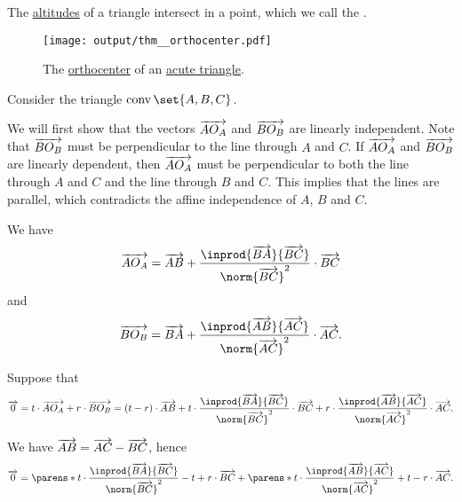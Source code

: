 \begin{proposition}\label{thm:orthocenter}\mimprovised
  The \hyperref[def:triangle_altitude]{altitudes} of a triangle intersect in a point, which we call the .

  \begin{figure}[!ht]
    \centering
    \texttt{[image: output/thm\_\_orthocenter.pdf]}
    \caption{The \hyperref[thm:orthocenter]{orthocenter} of an \hyperref[def:triangle/acute]{acute triangle}.}\label{fig:thm:orthocenter}
  \end{figure}
\end{proposition}
\begin{defproof}
  Consider the triangle \( \conv\set{ A, B, C } \).

  We will first show that the vectors \( \overrightarrow{A O_A} \) and \( \overrightarrow{B O_B} \) are linearly independent. Note that \( \overrightarrow{B O_B} \) must be perpendicular to the line through \( A \) and \( C \). If \( \overrightarrow{A O_A} \) and \( \overrightarrow{B O_B} \) are linearly dependent, then  \( \overrightarrow{A O_A} \) must be perpendicular to both the line through \( A \) and \( C \) and the line through \( B \) and \( C \). This implies that the lines are parallel, which contradicts the affine independence of \( A \), \( B \) and \( C \).

  We have
  \begin{equation*}
    \vect{A O_A}
    =
    \vect{AB} + \frac {\inprod {\vect{BA}} {\vect{BC}}} {\norm{\vect{BC}}^2} \cdot \vect{BC}
  \end{equation*}
  and
  \begin{equation*}
    \vect{B O_B}
    =
    \vect{BA} + \frac {\inprod {\vect{AB}} {\vect{AC}}} {\norm{\vect{AC}}^2} \cdot \vect{AC}.
  \end{equation*}

  Suppose that
  \begin{equation*}
    \vect 0
    =
    t \cdot \vect{A O_A} + r \cdot \vect{B O_B}
    =
    (t - r) \cdot \vect{AB} + t \cdot \frac {\inprod {\vect{BA}} {\vect{BC}}} {\norm{\vect{BC}}^2} \cdot \vect{BC} + r \cdot \frac {\inprod {\vect{AB}} {\vect{AC}}} {\norm{\vect{AC}}^2} \cdot \vect{AC}.
  \end{equation*}

  We have \( \overrightarrow{AB} = \overrightarrow{AC} - \overrightarrow{BC} \), hence
  \begin{equation*}
    \vect 0
    =
    \parens*{ t \cdot \frac {\inprod {\vect{BA}} {\vect{BC}}} {\norm{\vect{BC}}^2} - t + r } \cdot \vect{BC}
    +
    \parens*{ t \cdot \frac {\inprod {\vect{AB}} {\vect{AC}}} {\norm{\vect{AC}}^2} + t - r } \cdot \vect{AC}.
  \end{equation*}


\end{defproof}
